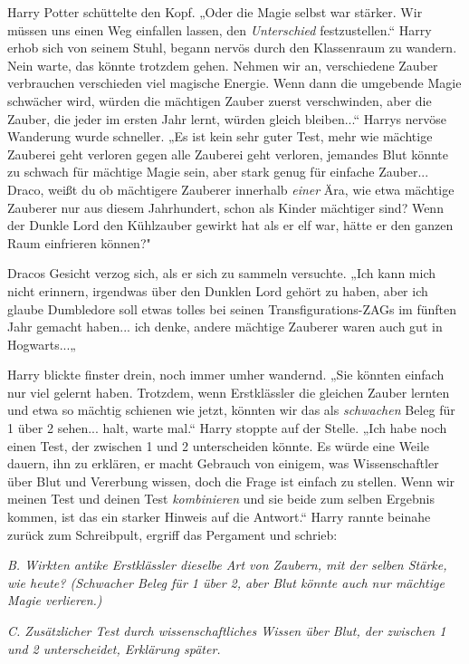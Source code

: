 {Harry Potter schüttelte den Kopf. „Oder die Magie selbst war stärker. Wir müssen uns einen Weg einfallen lassen, den \emph{Unterschied} festzustellen.“ Harry erhob sich von seinem Stuhl, begann nervös durch den Klassenraum zu wandern. Nein warte, das könnte trotzdem gehen. Nehmen wir an, verschiedene Zauber verbrauchen verschieden viel magische Energie. Wenn dann die umgebende Magie schwächer wird, würden die mächtigen Zauber zuerst verschwinden, aber die Zauber, die jeder im ersten Jahr lernt, würden gleich bleiben...“ Harrys nervöse Wanderung wurde schneller. „Es ist kein sehr guter Test, mehr wie mächtige Zauberei geht verloren gegen alle Zauberei geht verloren, jemandes Blut könnte zu schwach für mächtige Magie sein, aber stark genug für einfache Zauber... Draco, weißt du ob mächtigere Zauberer innerhalb \emph{einer} Ära, wie etwa mächtige Zauberer nur aus diesem Jahrhundert, schon als Kinder mächtiger sind? Wenn der Dunkle Lord den Kühlzauber gewirkt hat als er elf war, hätte er den ganzen Raum einfrieren können?"

Dracos Gesicht verzog sich, als er sich zu sammeln versuchte. „Ich kann mich nicht erinnern, irgendwas über den Dunklen Lord gehört zu haben, aber ich glaube Dumbledore soll etwas tolles bei seinen Transfigurations-ZAGs im fünften Jahr gemacht haben... ich denke, andere mächtige Zauberer waren auch gut in Hogwarts...„

Harry blickte finster drein, noch immer umher wandernd. „Sie könnten einfach nur viel gelernt haben. Trotzdem, wenn Erstklässler die gleichen Zauber lernten und etwa so mächtig schienen wie jetzt, könnten wir das als \emph{schwachen} Beleg für 1 über 2 sehen... halt, warte mal.“ Harry stoppte auf der Stelle. „Ich habe noch einen Test, der zwischen 1 und 2 unterscheiden könnte. Es würde eine Weile dauern, ihn zu erklären, er macht Gebrauch von einigem, was Wissenschaftler über Blut und Vererbung wissen, doch die Frage ist einfach zu stellen. Wenn wir meinen Test und deinen Test \emph{kombinieren} und sie beide zum selben Ergebnis kommen, ist das ein starker Hinweis auf die Antwort.“ Harry rannte beinahe zurück zum Schreibpult, ergriff das Pergament und schrieb:

\emph{B. Wirkten antike Erstklässler dieselbe Art von Zaubern, mit der selben Stärke, wie heute? (Schwacher Beleg für 1 über 2, aber Blut könnte auch nur mächtige Magie verlieren.)}

\emph{C. Zusätzlicher Test durch wissenschaftliches Wissen über Blut, der zwischen 1 und 2 unterscheidet, Erklärung später.}

}
